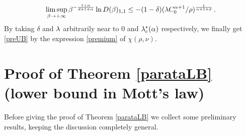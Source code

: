 \documentclass[12pt,a4paper,reqno]{amsart}
\newcommand{\bbE}{{\ensuremath{\mathbb E}} }
\newcommand{\bbP}{{\ensuremath{\mathbb P}} }
\let\a=\alpha \let\b=\beta   \let\d=\delta  \let\e=\varepsilon
\newcommand{\rosso}{\textcolor{black}} %
\newcommand{\vvv}{\textcolor{black}} %
\newcommand{\be}{\begin{equation}}
\newcommand{\en}{\end{equation}}
\newcommand{\vpz}{\vvv{\bbP^{\hspace{0.013cm}0} }}
\newcommand{\bvpz}{\vvv{{\bar\bbP}^{\hspace{0.013cm}0} }}
\begin{document}
\[ \limsup _{\b\to +\infty}  \b^{- \frac{1+\a}{d+1+\a} } \ln D(\b)_{1,1} 
\leq
-(1-\d) (\l C_0^{\a+1} /\rho )^{\frac{1}{\a+1+d}} \,.
\]
By taking $\d$ and $\lambda$ arbitrarily near to $0$ and $ \l_c^*(\a)$ respectively, we finally get \eqref{preUB} by the expression \eqref{premium} of $\chi(\rho,\nu)$.

\section{Proof of Theorem  \ref{parataLB} (lower bound in Mott's law)}\label{sec_LB}
Before giving the proof of Theorem \ref{parataLB}  we collect some preliminary results, keeping the discussion completely general.
\end{document}
